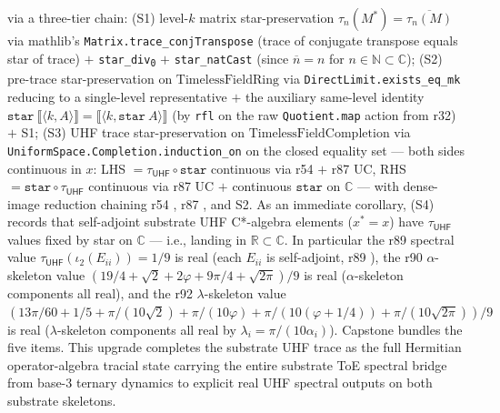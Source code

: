 \documentclass[11pt,a4paper]{amsart}
\theoremstyle{plain}
\theoremstyle{definition}
\begin{document}
via a three-tier chain: (S1) level-$k$ matrix star-preservation  $\tau_n(M^*) = \overline{\tau_n(M)}$ via mathlib's \texttt{Matrix.trace\_conjTranspose} (trace of conjugate transpose equals star of trace) $+$ \texttt{star\_div\textsubscript{0}} $+$ \texttt{star\_natCast} (since $\overline{n} = n$ for $n \in \mathbb{N} \subset \mathbb{C}$); (S2) pre-trace star-preservation on $\mathrm{TimelessFieldRing}$  via \texttt{DirectLimit.exists\_eq\_mk} reducing to a single-level representative $+$ the auxiliary same-level identity  $\mathtt{star}~\llbracket \langle k, A \rangle \rrbracket = \llbracket \langle k, \mathtt{star}~A \rangle \rrbracket$ (by \texttt{rfl} on the raw \texttt{Quotient.map} action from r32) $+$ S1; (S3) UHF trace star-preservation on $\mathrm{TimelessFieldCompletion}$  via \texttt{UniformSpace.Completion.induction\_on} on the closed equality set --- both sides continuous in $x$: LHS $= \tau_{\textsf{UHF}} \circ \mathtt{star}$ continuous via r54  $+$ r87 UC, RHS $= \mathtt{star} \circ \tau_{\textsf{UHF}}$ continuous via r87 UC $+$ continuous $\mathtt{star}$ on $\mathbb{C}$ --- with dense-image reduction chaining r54 , r87 , and S2. As an immediate corollary,  (S4) records that self-adjoint substrate UHF C*-algebra elements ($x^* = x$) have $\tau_{\textsf{UHF}}$ values fixed by star on $\mathbb{C}$ --- i.e., landing in $\mathbb{R} \subset \mathbb{C}$. In particular the r89 spectral value $\tau_{\textsf{UHF}}(\iota_2(E_{ii})) = 1/9$ is real (each $E_{ii}$ is self-adjoint, r89 ), the r90 $\alpha$-skeleton value $(19/4 + \sqrt{2} + 2\varphi + 9\pi/4 + \sqrt{2\pi})/9$ is real ($\alpha$-skeleton components all real), and the r92 $\lambda$-skeleton value $(13\pi/60 + 1/5 + \pi/(10\sqrt{2}) + \pi/(10\varphi) + \pi/(10(\varphi + 1/4)) + \pi/(10\sqrt{2\pi}))/9$ is real ($\lambda$-skeleton components all real by $\lambda_i = \pi/(10\alpha_i)$). Capstone  bundles the five items. This upgrade completes the substrate UHF trace as the full Hermitian operator-algebra tracial state carrying the entire substrate ToE spectral bridge from base-3 ternary dynamics to explicit real UHF spectral outputs on both substrate skeletons.
\end{document}
